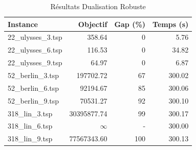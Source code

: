 \begin{table}[H]
\centering
\caption{Résultats Dualisation Robuste}
\small
\begin{tabular}{|l|r|r|r|}
\hline
\textbf{Instance} & \textbf{Objectif} & \textbf{Gap (\%)} & \textbf{Temps (s)} \\
\hline
22\_ulysses\_3.tsp & 358.64 & 0 & 5.76 \\
22\_ulysses\_6.tsp & 116.53 & 0 & 34.82 \\
22\_ulysses\_9.tsp & 64.97 & 0 & 6.87 \\
52\_berlin\_3.tsp & 197702.72 & 67 & 300.02 \\
52\_berlin\_6.tsp & 92194.67 & 85 & 300.06 \\
52\_berlin\_9.tsp & 70531.27 & 92 & 300.10 \\
318\_lin\_3.tsp & 30395877.74 & 99 & 300.17 \\
318\_lin\_6.tsp & $\infty$ & - & 300.00 \\
318\_lin\_9.tsp & 77567343.60 & 100 & 300.13 \\
\hline
\end{tabular}
\end{table}
